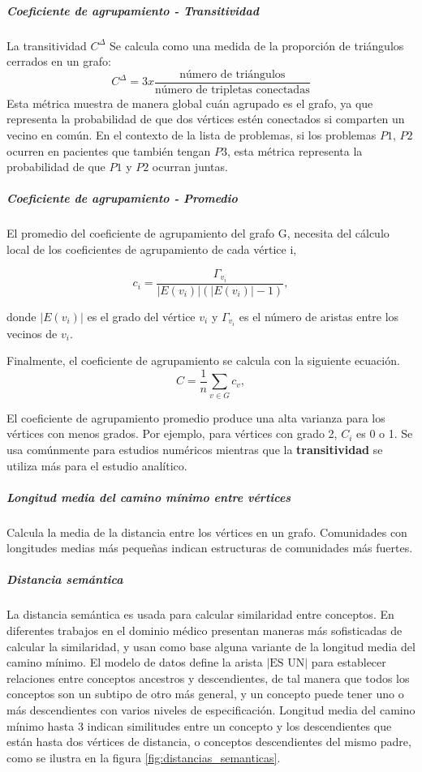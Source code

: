 \subparagraph{Coeficiente de agrupamiento - Transitividad}
La transitividad \cite{Wasserman1994} $C^{\Delta}$ Se calcula como una medida de la proporción de triángulos cerrados en un grafo:
\begin{equation}
C^{\Delta} =3x\frac{\text{número de triángulos}}{\text{número de tripletas conectadas}}
\end{equation}
Esta métrica muestra de manera global cuán agrupado es el grafo, ya que representa la probabilidad de que dos vértices estén conectados si comparten un vecino en común. En el contexto de la lista de problemas, si los problemas $P1$, $P2$ ocurren en pacientes que también tengan $P3$, esta métrica representa la probabilidad de que $P1$ y $P2$ ocurran juntas.

\subparagraph{Coeficiente de agrupamiento - Promedio}\cite{Saramaki2006,Kaiser2008}
El promedio del coeficiente de agrupamiento del grafo G, necesita del cálculo local de los coeficientes de agrupamiento de cada vértice i,

\begin{equation}
c_{i} = \frac{\Gamma_{v_{i}}}{|E(v_{i})|(|E(v_{i})|-1)},
\end{equation}

donde $|E(v_{i})|$ es el grado del vértice $v_{i}$ y $\Gamma_{v_{i}}$ es el número de aristas entre los vecinos de $v_{i}$.

Finalmente, el coeficiente de agrupamiento se calcula con la siguiente ecuación.
\begin{equation}
C = \frac{1}{n}\sum_{v \in G} c_v,
\end{equation}

El coeficiente de agrupamiento promedio produce una alta varianza para los vértices con menos grados. Por ejemplo, para vértices con grado 2, $C_{i}$ es 0 o 1. Se usa comúnmente para estudios numéricos mientras que la \textbf{transitividad} se utiliza más para el estudio analítico.\cite{Tang2010}

\subparagraph{Longitud media del camino mínimo entre vértices}
Calcula la media de la distancia entre los vértices en un grafo. Comunidades con longitudes medias más pequeñas indican estructuras de comunidades más fuertes.

\subparagraph{Distancia semántica}
La distancia semántica es usada para calcular similaridad entre conceptos. En diferentes trabajos en el dominio médico \cite{Wang2010,Gan2013,Pedersen2007,Zare2015ASNOMED-CT} presentan maneras más sofisticadas de calcular la similaridad, y usan como base alguna variante de la longitud media del camino mínimo.
El modelo de datos define la arista $|\text{ES UN}|$ para establecer relaciones entre conceptos ancestros y descendientes, de tal manera que todos los conceptos son un subtipo de otro más general, y un concepto puede tener uno o más descendientes con varios niveles de especificación. Longitud media del camino mínimo hasta 3 indican similitudes entre un concepto y los descendientes que están hasta dos vértices de distancia, o conceptos descendientes del mismo padre, como se ilustra en la figura \ref{fig:distancias_semanticas}.

